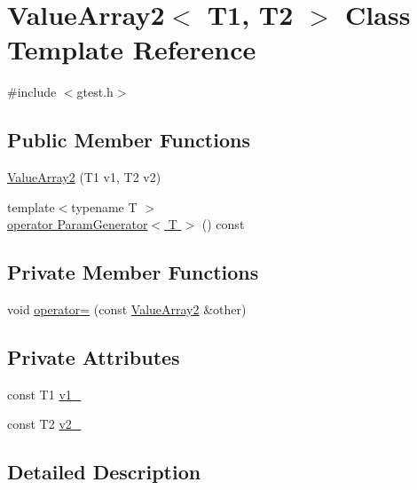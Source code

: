 \hypertarget{classtesting_1_1internal_1_1ValueArray2}{\section{\-Value\-Array2$<$ \-T1, \-T2 $>$ \-Class \-Template \-Reference}
\label{df/d70/classtesting_1_1internal_1_1ValueArray2}
}


{\ttfamily \#include $<$gtest.\-h$>$}

\subsection*{\-Public \-Member \-Functions}
\begin{DoxyCompactItemize}
\item 
\hyperlink{classtesting_1_1internal_1_1ValueArray2_af555452a3a8969b4592b7fbc497d8ae4}{\-Value\-Array2} (\-T1 v1, \-T2 v2)
\item 
{\footnotesize template$<$typename T $>$ }\\\hyperlink{classtesting_1_1internal_1_1ValueArray2_a08ef46fa12c9dd8ef6fc630baeea89b7}{operator Param\-Generator$<$ T $>$} () const 
\end{DoxyCompactItemize}
\subsection*{\-Private \-Member \-Functions}
\begin{DoxyCompactItemize}
\item 
void \hyperlink{classtesting_1_1internal_1_1ValueArray2_a557480709ed5193c52b975e573182e5b}{operator=} (const \hyperlink{classtesting_1_1internal_1_1ValueArray2}{\-Value\-Array2} \&other)
\end{DoxyCompactItemize}
\subsection*{\-Private \-Attributes}
\begin{DoxyCompactItemize}
\item 
const \-T1 \hyperlink{classtesting_1_1internal_1_1ValueArray2_aac1d0654cc6c1aceb4a5d0fa7a98042e}{v1\-\_\-}
\item 
const \-T2 \hyperlink{classtesting_1_1internal_1_1ValueArray2_a9f0a8ce6ce2fd27e980c4c51a7a7256a}{v2\-\_\-}
\end{DoxyCompactItemize}


\subsection{\-Detailed \-Description}
